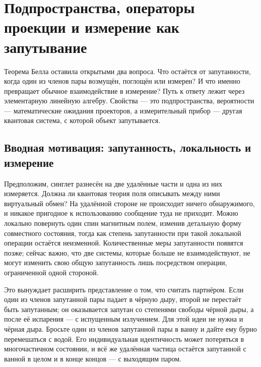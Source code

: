 \chapter{Подпространства, операторы проекции и измерение как запутывание}

Теорема Белла оставила открытыми два вопроса. Что остаётся от запутанности, когда один из членов пары возмущён, поглощён или измерен? И что именно превращает обычное взаимодействие в измерение? Путь к ответу лежит через элементарную линейную алгебру. Свойства — это подпространства, вероятности — математические ожидания проекторов, а измерительный прибор — другая квантовая система, с которой объект запутывается.

\section{Вводная мотивация: запутанность, локальность и измерение}

Предположим, синглет разнесён на две удалённые части и одна из них измеряется. Должна ли квантовая теория поля описывать между ними виртуальный обмен? На удалённой стороне не происходит ничего обнаружимого, и никакое пригодное к использованию сообщение туда не приходит. Можно локально повернуть один спин магнитным полем, изменив детальную форму совместного состояния, тогда как степень запутанности при такой локальной операции остаётся неизменной. Количественные меры запутанности появятся позже; сейчас важно, что две системы, которые больше не взаимодействуют, не могут изменить свою общую запутанность лишь посредством операции, ограниченной одной стороной.

\begin{classroomqa}
\end{classroomqa}

Это вынуждает расширить представление о том, что считать партнёром. Если один из членов запутанной пары падает в чёрную дыру, второй не перестаёт быть запутанным; он оказывается запутан со степенями свободы чёрной дыры, а после её испарения — с испущенным излучением. Для этой идеи не нужна и чёрная дыра. Бросьте один из членов запутанной пары в ванну и дайте ему бурно перемешаться с водой. Его индивидуальная идентичность может потеряться в многочастичном состоянии, и всё же удалённая частица остаётся запутанной с ванной в целом и в конце концов — с выходящим паром.


